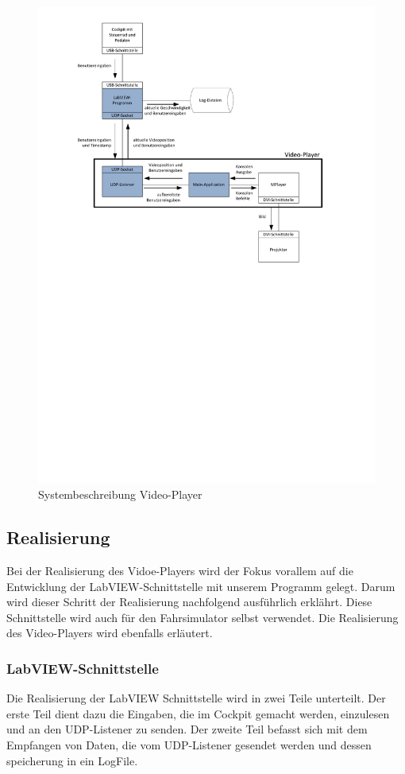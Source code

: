 \begin{figure}[H]
\centering 
\includegraphics[width=0.8\linewidth]{src/Systembeschreibung_VideoPlayer.pdf}
\caption{Systembeschreibung Video-Player} %
\label{Systembeschreibung Video-Player} %
\end{figure}

\subsection{Realisierung}
Bei der Realisierung des Vidoe-Players wird der Fokus vorallem auf die Entwicklung der LabVIEW-Schnittstelle mit unserem Programm gelegt. Darum wird dieser Schritt der Realisierung nachfolgend ausführlich erklährt. Diese Schnittstelle wird auch für den Fahrsimulator selbst verwendet. Die Realisierung des Video-Players wird ebenfalls erläutert.

\subsubsection{LabVIEW-Schnittstelle}
\label{labview_schnittstelle}
Die Realisierung der LabVIEW Schnittstelle wird in zwei Teile unterteilt. Der erste Teil dient dazu die Eingaben, die im Cockpit gemacht werden, einzulesen und an den UDP-Listener zu senden. Der zweite Teil befasst sich mit dem Empfangen von Daten, die vom UDP-Listener gesendet werden und dessen speicherung in ein LogFile. 

